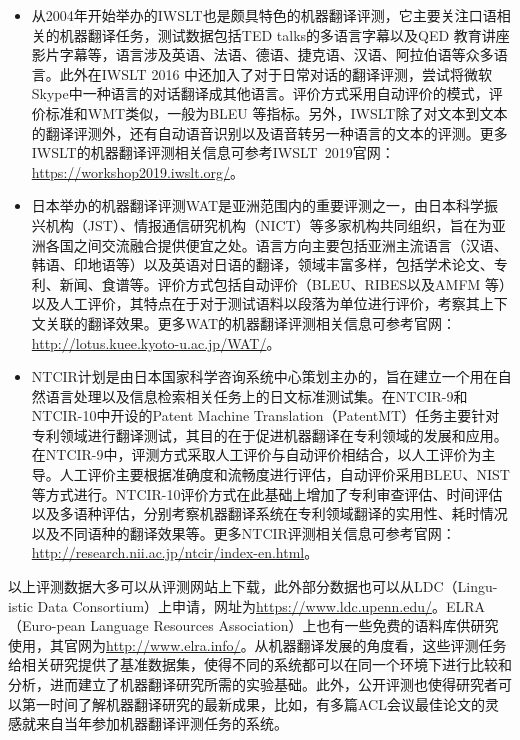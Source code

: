 \begin{appendices}
\begin{itemize}
\vspace{0.5em}
\item 从2004年开始举办的IWSLT也是颇具特色的机器翻译评测，它主要关注口语相关的机器翻译任务，测试数据包括TED talks的多语言字幕以及QED 教育讲座影片字幕等，语言涉及英语、法语、德语、捷克语、汉语、阿拉伯语等众多语言。此外在IWSLT 2016 中还加入了对于日常对话的翻译评测，尝试将微软Skype中一种语言的对话翻译成其他语言。评价方式采用自动评价的模式，评价标准和WMT类似，一般为BLEU 等指标。另外，IWSLT除了对文本到文本的翻译评测外，还有自动语音识别以及语音转另一种语言的文本的评测。更多IWSLT的机器翻译评测相关信息可参考IWSLT\ 2019官网：\url{https://workshop2019.iwslt.org/}。
\vspace{0.5em}
\item 日本举办的机器翻译评测WAT是亚洲范围内的重要评测之一，由日本科学振兴机构（JST）、情报通信研究机构（NICT）等多家机构共同组织，旨在为亚洲各国之间交流融合提供便宜之处。语言方向主要包括亚洲主流语言（汉语、韩语、印地语等）以及英语对日语的翻译，领域丰富多样，包括学术论文、专利、新闻、食谱等。评价方式包括自动评价（BLEU、RIBES以及AMFM 等）以及人工评价，其特点在于对于测试语料以段落为单位进行评价，考察其上下文关联的翻译效果。更多WAT的机器翻译评测相关信息可参考官网：\url{http://lotus.kuee.kyoto-u.ac.jp/WAT/}。
\vspace{0.5em}
\item NTCIR计划是由日本国家科学咨询系统中心策划主办的，旨在建立一个用在自然语言处理以及信息检索相关任务上的日文标准测试集。在NTCIR-9和NTCIR-10中开设的Patent Machine Translation（PatentMT）任务主要针对专利领域进行翻译测试，其目的在于促进机器翻译在专利领域的发展和应用。在NTCIR-9中，评测方式采取人工评价与自动评价相结合，以人工评价为主导。人工评价主要根据准确度和流畅度进行评估，自动评价采用BLEU、NIST等方式进行。NTCIR-10评价方式在此基础上增加了专利审查评估、时间评估以及多语种评估，分别考察机器翻译系统在专利领域翻译的实用性、耗时情况以及不同语种的翻译效果等。更多NTCIR评测相关信息可参考官网：\url{http://research.nii.ac.jp/ntcir/index-en.html}。
\vspace{0.5em}
\end{itemize}

\parinterval 以上评测数据大多可以从评测网站上下载，此外部分数据也可以从LDC（Lingu-istic Data Consortium）上申请，网址为\url{https://www.ldc.upenn.edu/}。ELRA（Euro-pean Language Resources Association）上也有一些免费的语料库供研究使用，其官网为\url{http://www.elra.info/}。从机器翻译发展的角度看，这些评测任务给相关研究提供了基准数据集，使得不同的系统都可以在同一个环境下进行比较和分析，进而建立了机器翻译研究所需的实验基础。此外，公开评测也使得研究者可以第一时间了解机器翻译研究的最新成果，比如，有多篇ACL会议最佳论文的灵感就来自当年参加机器翻译评测任务的系统。


\end{appendices}

